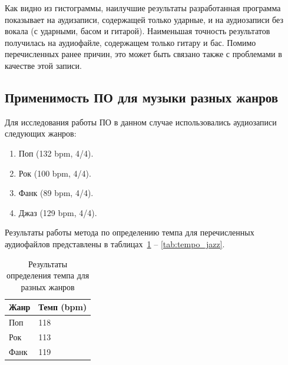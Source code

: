 \newpage

Как видно из гистограммы, наилучшие результаты разработанная программа показывает на аудизаписи, содержащей только ударные, и на аудиозаписи без вокала (с ударными, басом и гитарой). Наименьшая точность результатов получилась на аудиофайле, содержащем только гитару и бас. Помимо перечисленных ранее причин, это может быть связано также с проблемами в качестве этой записи.

\subsection{Применимость ПО для музыки разных жанров}

Для исследования работы ПО в данном случае использовались аудиозаписи следующих жанров:

\begin{enumerate}
	\item Поп (132 bpm, 4/4).
	\item Рок (100 bpm, 4/4).
	\item Фанк (89 bpm, 4/4).
	\item Джаз (129 bpm, 4/4).
\end{enumerate}

Результаты работы метода по определению темпа для перечисленных аудиофайлов представлены в таблицах~\ref{tab:tempo_genres} -- \ref{tab:tempo_jazz}.

\begin{table}[!h]
	\begin{center}
		\caption{\label{tab:tempo_genres}Результаты определения темпа для разных жанров}
		\begin{tabular}{|p{8cm}|p{8cm}|}
			\hline
			\textbf{Жанр} & \textbf{Темп (bpm)}\\
			\hline
			Поп & 118\\
			\hline
			Рок & 113\\
			\hline
			Фанк & 119\\
			\hline
		\end{tabular}
	\end{center}
\end{table}

